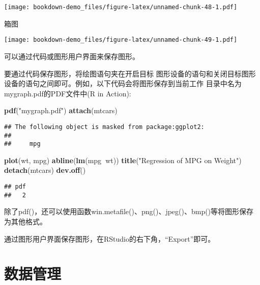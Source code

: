 \documentclass[]{book}
\newenvironment{Shaded}{\begin{snugshade}}{\end{snugshade}}
\newcommand{\KeywordTok}[1]{\textcolor[rgb]{0.13,0.29,0.53}{\textbf{#1}}}
\newcommand{\NormalTok}[1]{#1}
\newcommand{\OperatorTok}[1]{\textcolor[rgb]{0.81,0.36,0.00}{\textbf{#1}}}
\newcommand{\StringTok}[1]{\textcolor[rgb]{0.31,0.60,0.02}{#1}}
\begin{document}
\texttt{[image: bookdown-demo\_files/figure-latex/unnamed-chunk-48-1.pdf]}

箱图

\begin{Shaded}
\end{Shaded}

\texttt{[image: bookdown-demo\_files/figure-latex/unnamed-chunk-49-1.pdf]}

可以通过代码或图形用户界面来保存图形。

要通过代码保存图形，将绘图语句夹在开启目标
图形设备的语句和关闭目标图形设备的语句之间即可。例如，以下代码会将图形保存到当前工作
目录中名为mygraph.pdf的PDF文件中(R in Action):

\begin{Shaded}
\begin{Highlighting}[]
\KeywordTok{pdf}\NormalTok{(}\StringTok{"mygraph.pdf"}\NormalTok{)}
      \KeywordTok{attach}\NormalTok{(mtcars)}
\end{Highlighting}
\end{Shaded}

\begin{verbatim}
## The following object is masked from package:ggplot2:
## 
##     mpg
\end{verbatim}

\begin{Shaded}
\begin{Highlighting}[]
      \KeywordTok{plot}\NormalTok{(wt, mpg)}
      \KeywordTok{abline}\NormalTok{(}\KeywordTok{lm}\NormalTok{(mpg}\OperatorTok{~}\NormalTok{wt))}
      \KeywordTok{title}\NormalTok{(}\StringTok{"Regression of MPG on Weight"}\NormalTok{)}
      \KeywordTok{detach}\NormalTok{(mtcars)}
\KeywordTok{dev.off}\NormalTok{()}
\end{Highlighting}
\end{Shaded}

\begin{verbatim}
## pdf 
##   2
\end{verbatim}

除了pdf()，还可以使用函数win.metafile()、png()、jpeg()、bmp()等将图形保存为其他格式。

通过图形用户界面保存图形，在RStudio的右下角，``Export''即可。

\chapter{数据管理}
\end{document}
